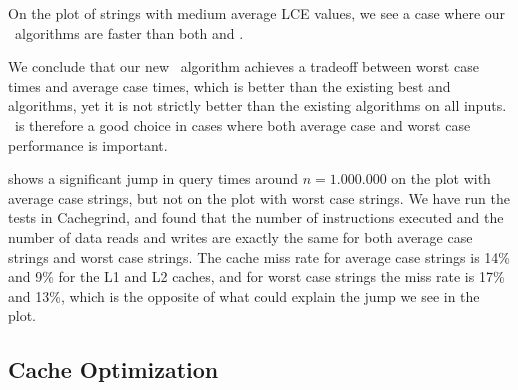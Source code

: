 \documentclass[a4]{article}
\begin{document}
On the plot of strings with medium average LCE values, we see a case where our \fprintk\ algorithms are faster than both  and .

We conclude that our new \fprintk\ algorithm achieves a tradeoff between worst case times and average case times, which is better than the existing best  and  algorithms, yet it is not strictly better than the existing algorithms on all inputs. \fprintk\ is therefore a good choice in cases where both average case and worst case performance is important.


 shows a significant jump in query times around $n=1.000.000$ on the plot with average case strings, but not on the plot with worst case strings. We have run the tests in Cachegrind, and found that the number of instructions executed and the number of data reads and writes are exactly the same for both average case strings and worst case strings. The cache miss rate for average case strings is 14\% and 9\% for the L1 and L2 caches, and for worst case strings the miss rate is 17\% and 13\%, which is the opposite of what could explain the jump we see in the plot.


\subsection{Cache Optimization}
\end{document}
